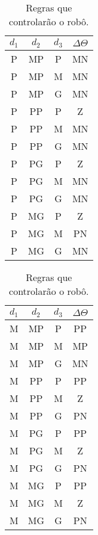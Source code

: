 				\begin{table}[H]
					\centering
					\caption{\label{tab:consequentes} Regras que controlarão o robô.}
					\setlength\tabcolsep{4pt}
					\begin{minipage}{0.30\textwidth}
					    \centering
						\begin{tabular}{| c | c | c | c |} 
						\hline
						\(d_1\) & \(d_2\) & \(d_3\) & \(\Delta \Theta\) \\ \hline
						P & MP & P & MN  \\ \hline
						P & MP & M & MN \\ \hline
						P & MP & G & MN \\ \hline
						P & PP & P & Z  \\ \hline
						P & PP & M & MN \\ \hline
						P & PP & G & MN \\ \hline
						P & PG & P & Z  \\ \hline
						P & PG & M & MN \\ \hline
						P & PG & G & MN \\ \hline
						P & MG & P & Z  \\ \hline
						P & MG & M & PN \\ \hline
						P & MG & G & MN \\ \hline
						\end{tabular}	
					\end{minipage}	      
					\begin{minipage}{0.30\textwidth}
					    \centering
						\begin{tabular}{| c | c | c | c |} 
						\hline
						\(d_1\) & \(d_2\) & \(d_3\) & \(\Delta \Theta\) \\ \hline
						M & MP & P & PP \\ \hline
						M & MP & M & MP \\ \hline
						M & MP & G & MN \\ \hline
						M & PP & P & PP \\ \hline
						M & PP & M & Z  \\ \hline
						M & PP & G & PN \\ \hline
						M & PG & P & PP \\ \hline
						M & PG & M & Z  \\ \hline
						M & PG & G & PN \\ \hline
						M & MG & P & PP \\ \hline
						M & MG & M & Z  \\ \hline
						M & MG & G & PN \\ \hline

\end{tabular}
\end{minipage}
\end{table}
